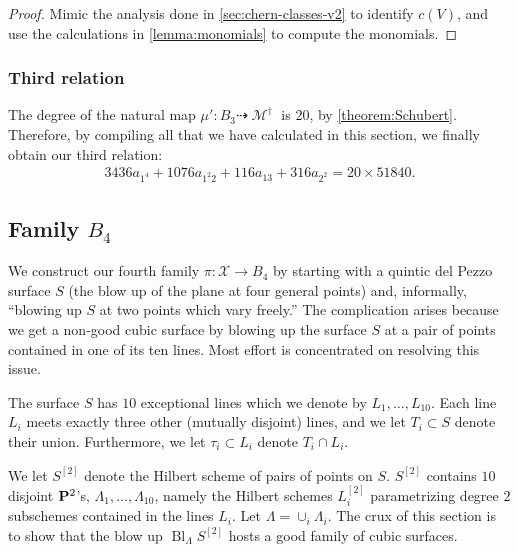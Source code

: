 \documentclass[12pt,reqno]{amsart}
\DeclareMathOperator{\Bl}{Bl}
\DeclareMathOperator{\M}{\mathcal{M}}
\renewcommand{\to}{{\longrightarrow}}
\numberwithin{equation}{section}
\newcommand{\cX}{\mathcal{X}}
\begin{document}
\begin{proof}
  Mimic the analysis done in \autoref{sec:chern-classes-v2} to
  identify $c(V)$, and use the calculations in
  \autoref{lemma:monomials} to compute the monomials.
\end{proof}

\subsubsection{Third relation}
\label{sec:third-relation}

The degree of the natural map
$\mu': B_{3} \dashrightarrow \M^{\dagger}$ is $20$, by
\autoref{theorem:Schubert}. Therefore, by compiling all that we have
calculated in this section, we finally obtain our third relation:
\begin{align}
  \label{eq:relation3}
  3436a_{1^4} + 1076a_{1^{2}2} + 116 a_{13} + 316 a_{2^{2}} = 20 \times 51840.
\end{align}







\subsection{Family $B_4$}




\label{sec:family-b_4}

We construct our fourth family $\pi: \cX \to B_4$ by starting with a
quintic del Pezzo surface $S$ (the blow up of the plane at four
general points) and, informally, ``blowing up $S$ at two points which
vary freely.''  The complication arises because we get a non-good
cubic surface by blowing up the surface $S$ at a pair of points
contained in one of its ten lines.  Most effort is concentrated on
resolving this issue.

The surface $S$ has $10$ exceptional lines which we denote by
$L_{1}, \dots, L_{10}$.  Each line $L_{i}$ meets exactly three other
(mutually disjoint) lines, and we let $T_{i} \subset S$ denote their
union. Furthermore, we let $\tau_{i} \subset L_{i}$ denote
$T_{i} \cap L_{i}$.

We let $S^{[2]}$ denote the Hilbert scheme of
pairs of points on $S$.  $S^{[2]}$ contains $10$ disjoint $\P^{2}$'s,
$\Lambda_1, \dots, \Lambda_{10}$, namely the Hilbert schemes
$L_{i}^{[2]}$ parametrizing degree $2$ subschemes contained in the
lines $L_{i}$. Let $\Lambda = \cup_{i}\Lambda_{i}$.  The crux of this
section is to show that the blow up $\Bl_{\Lambda}S^{[2]}$ hosts a
good family of cubic surfaces.
\end{document}
